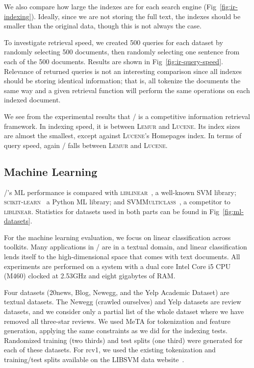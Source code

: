 We also compare how large the indexes are for each search engine
(Fig~\ref{fig:ir-indexing}). Ideally, since we are not storing the full text,
the indexes should be smaller than the original data, though this is not always
the case.

To investigate retrieval speed, we created 500 queries for each dataset by
randomly selecting 500 documents, then randomly selecting one sentence from each
of the 500 documents. Results are shown in Fig~\ref{fig:ir-query-speed}.
Relevance of returned queries is not an interesting comparison since all indexes
should be storing identical information; that is, all tokenize the documents the
same way and a given retrieval function will perform the same operations on each
indexed document.

We see from the experimental results that \meta/ is a competitive information
retrieval framework. In indexing speed, it is between \textsc{Lemur} and
\textsc{Lucene}. Its index sizes are almost the smallest, except against
\textsc{Lucene}'s Homepages index. In terms of query speed, again \meta/ falls
between \textsc{Lemur} and \textsc{Lucene}.







\subsection{Machine Learning}

\meta/'s ML performance is compared with \textsc{liblinear}~\cite{liblinear}, a
well-known SVM library; \textsc{scikit-learn}~\cite{scikit} a Python ML library;
and \textsc{SVMMulticlass}~\cite{svmmulticlass}, a competitor to
\textsc{liblinear}. Statistics for datasets used in both parts can be found in
Fig~\ref{fig:ml-datasets}.

For the machine learning evaluation, we focus on linear classification across
toolkits. Many applications in \meta/ are in a textual domain, and linear
classification lends itself to the high-dimensional space that comes with text
documents. All experiments are performed on a system with a dual core Intel Core
i5 CPU (M460) clocked at 2.53GHz and eight gigabytes of RAM.

Four datasets (20news, Blog, Newegg, and the Yelp Academic
Dataset\footnotemark[10]) are textual datasets. The Newegg (crawled ourselves)
and Yelp datasets are review datasets, and we consider only a partial list of
the whole dataset where we have removed all three-star reviews. We used MeTA for
tokenization and feature generation, applying the same constraints as we did for
the indexing tests. Randomized training (two thirds) and test splits (one third)
were generated for each of these datasets. For rcv1, we used the existing
tokenization and training/test splits available on the LIBSVM data
website~\footnotemark[11].

